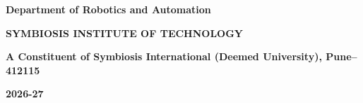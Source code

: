 \begin{titlepage}
    \vspace{0.8cm}
    {\fontsize{12}{15}\selectfont\textbf{Department of Robotics and Automation}\par}
    {\fontsize{12}{15}\selectfont\textbf{SYMBIOSIS INSTITUTE OF TECHNOLOGY}\par}
    {\fontsize{11}{14}\selectfont\textbf{A Constituent of Symbiosis International (Deemed University), Pune--412115}\par}
    
    \vspace{0.3cm}
    {\normalsize\textbf{2026-27}\par}
    
\end{titlepage}